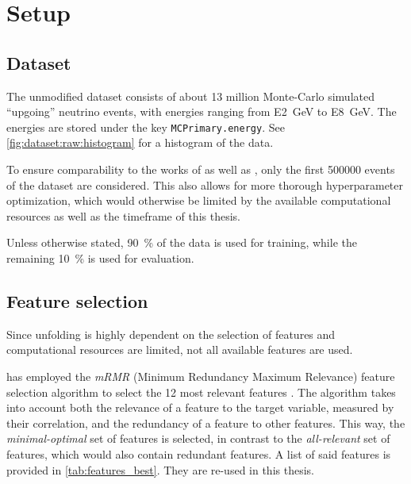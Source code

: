 \section{Setup}

\subsection{Dataset}
The unmodified dataset \cite{icecube_mc} consists of about 13 million Monte-Carlo simulated \enquote{upgoing} neutrino events,
with energies ranging from \SI{E2}{\giga\electronvolt} to \SI{E8}{\giga\electronvolt}.
The energies are stored under the key \texttt{MCPrimary.energy}. %
See \autoref{fig:dataset:raw:histogram} for a histogram of the data.

To ensure comparability to the works of \citeauthor{dsea_samuel} as well as \citeauthor{dsea_jan},
only the first \num{500000} events of the dataset are considered.
This also allows for more thorough hyperparameter optimization,
which would otherwise be limited by the available computational resources as well as the timeframe of this thesis.

Unless otherwise stated, %
\SI{90}{\percent} of the data is used for training,
while the remaining \SI{10}{\percent} is used for evaluation.


\subsection{Feature selection}
Since
  unfolding is highly dependent on the selection of features \citationneeded
  and computational resources are limited,
not all available features are used.

\citeauthor{dsea_jan} has employed the \emph{mRMR} (Minimum Redundancy Maximum Relevance) feature selection algorithm \cite{mrmr}
to select the 12 most relevant features \cite{dsea_jan}.
The algorithm takes into account both
  the relevance of a feature to the target variable,
    measured by their correlation,
  and the redundancy of a feature to other features.
This way,
the \emph{minimal-optimal} set of features is selected,
  in contrast to the \emph{all-relevant} set of features,
    which would also contain redundant features.
A list of said features is provided in \autoref{tab:features_best}.
They are re-used in this thesis.

